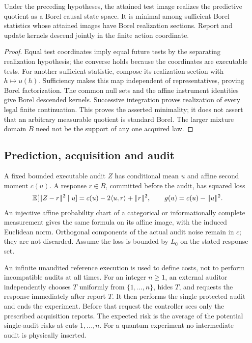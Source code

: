 \begin{lemma}\label{lem:quotient}
Under the preceding hypotheses, the attained test image realizes the predictive quotient as a Borel causal state space. It is minimal among sufficient Borel statistics whose attained images have Borel realization sections. Report and update kernels descend jointly in the finite action coordinate.
\end{lemma}
\begin{proof}
Equal test coordinates imply equal future tests by the separating realization hypothesis; the converse holds because the coordinates are executable tests. For another sufficient statistic, compose its realization section with $h\mapsto u(h)$. Sufficiency makes this map independent of representatives, proving Borel factorization. The common null sets and the affine instrument identities give Borel descended kernels. Successive integration proves realization of every legal finite continuation. This proves the asserted minimality; it does not assert that an arbitrary measurable quotient is standard Borel. The larger mixture domain $B$ need not be the support of any one acquired law.
\end{proof}

\subsection{Prediction, acquisition and audit}
A fixed bounded executable audit $Z$ has conditional mean $u$ and affine second moment $c(u)$. A response $r\in B$, committed before the audit, has squared loss
\begin{equation}\label{eq:loss}
 \mathbb E[\lVert Z-r\rVert^2\mid u]=c(u)-2\langle u,r\rangle+\lVert r\rVert^2,
 \qquad g(u)=c(u)-\lVert u\rVert^2.
\end{equation}
An injective affine probability chart of a categorical or informationally complete measurement gives the same formula on its affine image, with the induced Euclidean norm. Orthogonal components of the actual audit noise remain in $c$; they are not discarded. Assume the loss is bounded by $L_0$ on the stated response set.

An infinite unaudited reference execution is used to define costs, not to perform incompatible audits at all times. For an integer $n\ge1$, an external auditor independently chooses $T$ uniformly from $\{1,\ldots,n\}$, hides $T$, and requests the response immediately after report $T$. It then performs the single protected audit and ends the experiment. Before that request the controller sees only the prescribed acquisition reports. The expected risk is the average of the potential single-audit risks at cuts $1,\ldots,n$. For a quantum experiment no intermediate audit is physically inserted.

